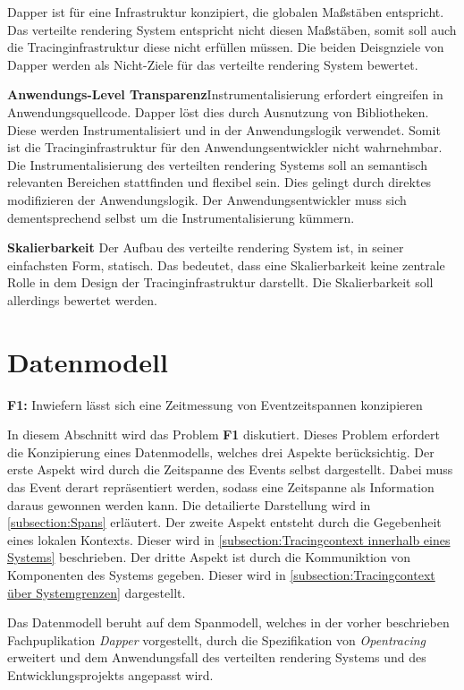 Dapper ist für eine Infrastruktur konzipiert, die globalen  Maßstäben entspricht. Das verteilte rendering System entspricht nicht diesen Maßstäben, somit soll auch die Tracinginfrastruktur diese nicht erfüllen müssen. Die beiden Deisgnziele von Dapper werden als Nicht-Ziele für das verteilte rendering System bewertet.

\textbf{Anwendungs-Level Transparenz}\space\space\space Instrumentalisierung erfordert eingreifen in Anwendungsquellcode. Dapper löst dies durch Ausnutzung von Bibliotheken. Diese werden Instrumentalisiert und in der Anwendungslogik verwendet. Somit ist die Tracinginfrastruktur für den Anwendungsentwickler nicht wahrnehmbar. Die Instrumentalisierung des verteilten rendering Systems soll an semantisch relevanten Bereichen stattfinden und flexibel sein. Dies gelingt durch direktes modifizieren der Anwendungslogik. Der Anwendungsentwickler muss sich dementsprechend selbst um die Instrumentalisierung kümmern. 

\textbf{Skalierbarkeit} \space\space\space Der Aufbau des verteilte rendering System ist, in seiner einfachsten Form, statisch. Das bedeutet, dass eine Skalierbarkeit keine zentrale Rolle in dem Design der Tracinginfrastruktur darstellt. Die Skalierbarkeit soll allerdings bewertet werden. 

\section{Datenmodell}
\label{section:Datenmodell}

\textbf{F1: }Inwiefern lässt sich eine Zeitmessung von Eventzeitspannen konzipieren

In diesem Abschnitt wird das Problem \textbf{F1} diskutiert.
Dieses Problem erfordert die Konzipierung eines Datenmodells, welches drei Aspekte berücksichtig. Der erste Aspekt wird durch die Zeitspanne des Events selbst dargestellt. Dabei muss das Event derart repräsentiert werden, sodass eine Zeitspanne als Information daraus gewonnen werden kann. Die detailierte Darstellung wird in \cref{subsection:Spans} erläutert. Der zweite Aspekt entsteht durch die Gegebenheit eines lokalen Kontexts. Dieser wird in \cref{subsection:Tracingcontext innerhalb eines Systems} beschrieben. Der dritte Aspekt ist durch die Kommuniktion von Komponenten des Systems gegeben. Dieser wird  in \cref{subsection:Tracingcontext über Systemgrenzen} dargestellt.


Das Datenmodell beruht auf dem Spanmodell, welches in der vorher beschrieben Fachpuplikation \emph{Dapper} vorgestellt, durch die Spezifikation von \emph{Opentracing} erweitert und dem Anwendungsfall des verteilten rendering Systems und des Entwicklungsprojekts angepasst wird.

